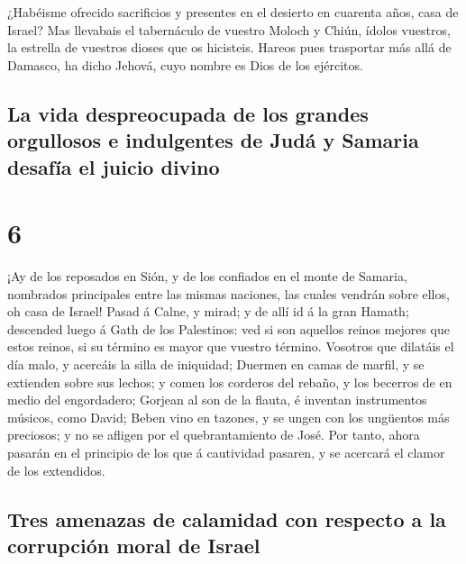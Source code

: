  ¿Habéisme ofrecido sacrificios y presentes en el
desierto en cuarenta años, casa de Israel?  Mas llevabais
el tabernáculo de vuestro Moloch y Chiún, ídolos vuestros, la estrella
de vuestros dioses que os hicisteis.  Hareos pues
trasportar más allá de Damasco, ha dicho Jehová, cuyo nombre es Dios de
los ejércitos.

\hypertarget{la-vida-despreocupada-de-los-grandes-orgullosos-e-indulgentes-de-juduxe1-y-samaria-desafuxeda-el-juicio-divino}{%
\subsection{La vida despreocupada de los grandes orgullosos e
indulgentes de Judá y Samaria desafía el juicio
divino}\label{la-vida-despreocupada-de-los-grandes-orgullosos-e-indulgentes-de-juduxe1-y-samaria-desafuxeda-el-juicio-divino}}

\hypertarget{section-30-6}{%
\section{6}\label{section-30-6}}

 ¡Ay de los reposados en Sión, y de los confiados en el
monte de Samaria, nombrados principales entre las mismas naciones, las
cuales vendrán sobre ellos, oh casa de Israel!  Pasad á
Calne, y mirad; y de allí id á la gran Hamath; descended luego á Gath de
los Palestinos: ved si son aquellos reinos mejores que estos reinos, si
su término es mayor que vuestro término.  Vosotros que
dilatáis el día malo, y acercáis la silla de iniquidad; 
Duermen en camas de marfil, y se extienden sobre sus lechos; y comen los
corderos del rebaño, y los becerros de en medio del engordadero;
 Gorjean al son de la flauta, é inventan instrumentos
músicos, como David;  Beben vino en tazones, y se ungen
con los ungüentos más preciosos; y no se afligen por el quebrantamiento
de José.  Por tanto, ahora pasarán en el principio de los
que á cautividad pasaren, y se acercará el clamor de los extendidos.

\hypertarget{tres-amenazas-de-calamidad-con-respecto-a-la-corrupciuxf3n-moral-de-israel}{%
\subsection{Tres amenazas de calamidad con respecto a la corrupción
moral de
Israel}\label{tres-amenazas-de-calamidad-con-respecto-a-la-corrupciuxf3n-moral-de-israel}}

